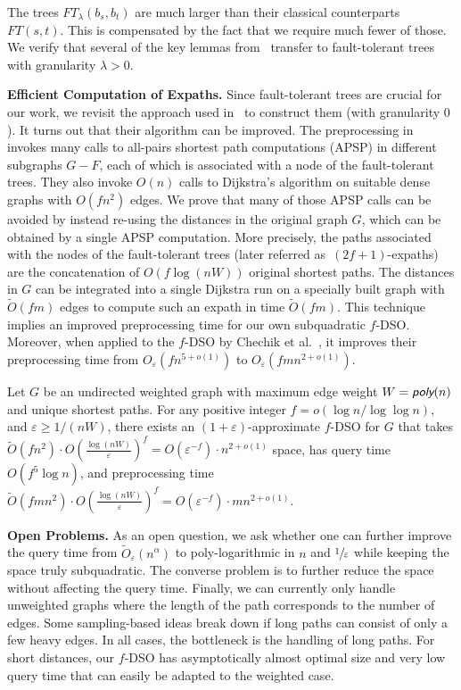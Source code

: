 \documentclass{theoretics}
\newcommand*{\Otilde}{\widetilde{O}}
\newcommand*{\poly}{\textsf{poly}}
\renewcommand{\ge}{\geqslant}
\newcommand{\eps}{\varepsilon}
\begin{document}
The trees $FT_\lambda(b_s, b_t)$ are much larger than their classical counterparts $FT(s,t)$.
This is compensated by the fact that we require much fewer of those. 
We verify that several of the key lemmas from~\cite{ChCoFiKa17} transfer to 
fault-tolerant trees with granularity $\lambda >0$. 
\vspace*{.5em}

\noindent
\textbf{Efficient Computation of Expaths.}
Since fault-tolerant trees are crucial for our work,
we revisit the approach used in~\cite{ChCoFiKa17} to construct them (with granularity $0$).
It turns out that their algorithm can be improved. 
The preprocessing in~\cite{ChCoFiKa17} invokes many calls to all-pairs shortest path computations (APSP) in different subgraphs $G-F$, each of which is associated with a node of the fault-tolerant trees. 
They also invoke $O(n)$ calls to Dijkstra's algorithm on suitable dense graphs with $O(fn^2)$ edges. 
We prove that many of those APSP calls can be avoided by instead re-using the distances in the original graph $G$, which can be obtained by a single APSP computation.
More precisely, the paths associated with the nodes of the fault-tolerant trees
(later referred as~$(2f+1)$-expaths) are the concatenation of $O(f \log (nW))$ original shortest paths.
The distances in $G$ can be integrated into a single Dijkstra run on a specially built graph with $\Otilde(fm)$ edges to compute such an expath in time $\Otilde(fm)$.
This technique implies an improved preprocessing time for our own subquadratic $f$-DSO.
Moreover, when applied to the $f$-DSO by Chechik et al.~\cite{ChCoFiKa17}, it improves their preprocessing time from $O_\varepsilon(fn^{5+o(1)})$ to $O_\varepsilon(fmn^{2+o(1)})$. 

\begin{theorem}
\label{thm:improved_preprocessing}
  Let $G$ be an undirected weighted graph with maximum edge weight $W = \emph{\poly}(n)$
  and unique shortest paths.
  For any positive integer $f = o(\log n/\log\log n)$,
  and $\varepsilon \ge 1/(nW)$,
  there exists an $(1{+}\varepsilon)$-approximate $f$-DSO for $G$ that takes
  $\Otilde(fn^2) \cdot O\!\left(\frac{\log(nW)}{\varepsilon}\right)^f 
    = O(\varepsilon^{-f}) \cdot n^{2+o(1)}$ space,
  has query time $O(f^5 \log n)$,
  and preprocessing time 
  $\Otilde(fmn^2) \cdot O\!\left(\frac{\log(nW)}{\varepsilon}\right)^f 
  	= O(\varepsilon^{-f}) \cdot mn^{2+o(1)}$.
\end{theorem} 

\noindent
\textbf{Open Problems.}
As an open question, we ask whether one can further improve the query time from 
$\Otilde_\eps(n^\alpha)$ to poly-logarithmic in $n$ and $\sfrac{1}{\eps}$ 
while keeping the space truly subquadratic.
The converse problem is to further reduce the space without affecting the query time.
Finally, we can currently only handle unweighted graphs
where the length of the path corresponds to the number of edges.
Some sampling-based ideas break down if long paths can consist of only a few heavy edges.
In all cases, the bottleneck is the handling of long paths.
For short distances, our $f$-DSO has asymptotically almost optimal size and very low query time that can easily be adapted to the weighted case.
\end{document}
